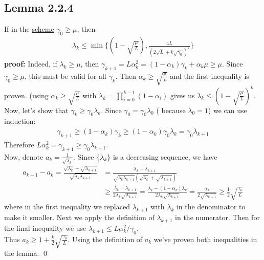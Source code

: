 \documentclass[12pt,a4paper]{article}
\begin{document}
	 \subsection*{Lemma 2.2.4}\label{lem224}
	 If in the \hyperref[sec22opt]{scheme} $\gamma_0 \geq \mu$, then
	 \begin{align*}
	 	\lambda_k \leq \min\{(1 - \sqrt{\frac{\mu}{L}}), \frac{4L}{(2\sqrt{L} + k \sqrt{\gamma_0})^2}\}
	 \end{align*}
	 \textbf{proof:} Indeed, if $\lambda_k \geq \mu$, then $\gamma_{k+1} = L \alpha_k^2 = (1 - \alpha_k)\gamma_k + \alpha_k\mu \geq \mu$. Since $\gamma_0 \geq \mu$, this must be valid for all $\gamma_k$. Then $\alpha_k \geq \sqrt{\frac{\mu}{L}}$ and the first inequality is proven. (using $\alpha_k \geq \sqrt{\frac{\mu}{L}}$ with $\lambda_k = \prod_{i=0}^{k-1}(1 - \alpha_i)$ gives us $\lambda_k \leq (1 - \sqrt{\frac{\mu}{L}})^k$.\\
	 Now, let's show that $\gamma_k \geq \gamma_0\lambda_k$. Since $\gamma_0 = \gamma_0\lambda_0$ ( because $\lambda_0 = 1$) we can use induction:
	 \begin{align*}
	 	\gamma_{k+1} \geq (1 - \alpha_k)\gamma_k \geq (1 - \alpha_k)\gamma_0\lambda_k = \gamma_0\lambda_{k+1}
	 \end{align*}
	 Therefore $L\alpha_k^2 = \gamma_{k+1} \geq \gamma_0\lambda_{k+1}$. \\
	 Now, denote $a_k = \frac{1}{\sqrt{\lambda_k}}$. Since $\{\lambda_k\}$ is a decreasing sequence, we have
	 \begin{align*}
	 	a_{k+1} - a_k = \frac{\sqrt{\lambda_k} - \sqrt{\lambda_{k+1}}}{\sqrt{\lambda_k\lambda_{k+1}}} &= \frac{\lambda_k - \lambda_{k+1}}{\sqrt{\lambda_k\lambda_{k+1}}(\sqrt{\lambda_k} + \sqrt{\lambda_{k+1}})} \\
	 	&\geq \frac{\lambda_k - \lambda_{k+1}}{2\lambda_k\sqrt{\lambda_{k+1}}} = \frac{\lambda_k - (1 - \alpha_k)\lambda_k}{2\lambda_k\sqrt{\lambda_{k+1}}} = \frac{\alpha_k}{2\sqrt{\lambda_{k+1}}} \geq \frac{1}{2}\sqrt{\frac{\gamma_0}{L}}
	 \end{align*}
	 where in the first inequality we replaced $\lambda_{k+1}$ with $\lambda_k$ in the denominator to make it smaller. Next we apply the definition of $\lambda_{k+1}$ in the numerator. Then for the final inequality we use $\lambda_{k+1} \leq L\alpha_k^2 / \gamma_0$. \\
	 Thus $a_k \geq 1 + \frac{k}{2}\sqrt{\frac{\gamma_0}{L}}$. Using the definition of $a_k$ we've proven both inequalities in the lemma. \qed \\
\end{document}
